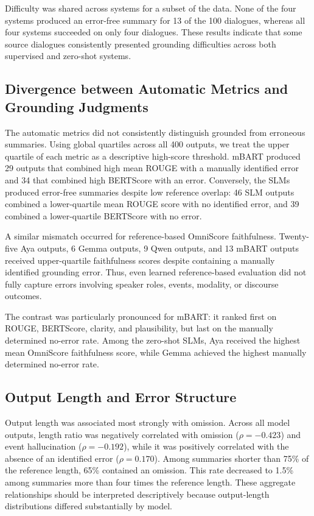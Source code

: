 \documentclass[11pt]{article}
\begin{document}
Difficulty was shared across systems for a subset of the data. None of the four systems produced an error-free summary for 13 of the 100 dialogues, whereas all four systems succeeded on only four dialogues. These results indicate that some source dialogues consistently presented grounding difficulties across both supervised and zero-shot systems.

\FloatBarrier

\subsection{Divergence between Automatic Metrics and Grounding Judgments}

The automatic metrics did not consistently distinguish grounded from erroneous summaries. Using global quartiles across all 400 outputs, we treat the upper quartile of each metric as a descriptive high-score threshold. mBART produced 29 outputs that combined high mean ROUGE with a manually identified error and 34 that combined high BERTScore with an error. Conversely, the SLMs produced error-free summaries despite low reference overlap: 46 SLM outputs combined a lower-quartile mean ROUGE score with no identified error, and 39 combined a lower-quartile BERTScore with no error.

A similar mismatch occurred for reference-based OmniScore faithfulness. Twenty-five Aya outputs, 6 Gemma outputs, 9 Qwen outputs, and 13 mBART outputs received upper-quartile faithfulness scores despite containing a manually identified grounding error. Thus, even learned reference-based evaluation did not fully capture errors involving speaker roles, events, modality, or discourse outcomes.

The contrast was particularly pronounced for mBART: it ranked first on ROUGE, BERTScore, clarity, and plausibility, but last on the manually determined no-error rate. Among the zero-shot SLMs, Aya received the highest mean OmniScore faithfulness score, while Gemma achieved the highest manually determined no-error rate.

\subsection{Output Length and Error Structure}

Output length was associated most strongly with omission. Across all model outputs, length ratio was negatively correlated with omission ($\rho=-0.423$) and event hallucination ($\rho=-0.192$), while it was positively correlated with the absence of an identified error ($\rho=0.170$). Among summaries shorter than 75\% of the reference length, 65\% contained an omission. This rate decreased to 1.5\% among summaries more than four times the reference length. These aggregate relationships should be interpreted descriptively because output-length distributions differed substantially by model.
\end{document}
